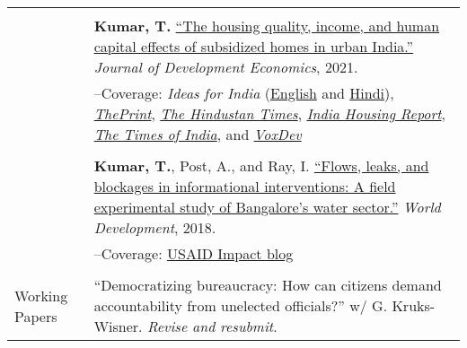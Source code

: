 \documentclass[letterpaper, 10.5pt]{article}
\begin{document}
\begin{longtable}{p{1.5in}p{5in}}
& \\

&\textbf{Kumar, T.} \href{https://doi.org/10.1016/j.jdeveco.2021.102738}{``The housing quality, income, and human capital effects of subsidized homes in urban India.''} \textit{Journal of Development Economics}, 2021.\\

&--\indent Coverage: \textit{Ideas for India} (\href{https://www.ideasforindia.in/topics/poverty-inequality/household-level-effects-of-affordable-housing-evidence-from-mumbai.html}{English} and \href{https://www.ideasforindia.in/topics/poverty-inequality/household-level-effects-of-affordable-housing-evidence-from-mumbai-hindi.html}{Hindi}), \href{https://theprint.in/opinion/mumbai-residents-win-govt-housing-lottery-and-spend-more-on-kids-education-jobs-study/290485/}{\textit{ThePrint}}, \href{https://www.hindustantimes.com/opinion/housing-is-a-welfare-weapon-it-can-help-people-escape-poverty-101629993983576.html}{\textit{The Hindustan Times}}, \href{https://indiahousingreport.in/outputs/opinion/housing-is-a-welfare-weapon-it-can-help-people-escape-poverty/}{\textit{India Housing Report}}, \href{https://timesofindia.indiatimes.com/city/mumbai/mhada-home-winners-see-upswing-in-family-edu-pay-in-mumbai-study/articleshow/86468320.cms}{\textit{The Times of India}}, and \href{https://voxdev.org/topic/infrastructure-urbanisation/household-level-effects-subsidised-housing-evidence-urban-india?utm_source=dlvr.it&utm_medium=twitter}{\textit{VoxDev}} \\
& \\

&\textbf{Kumar, T.},  Post, A., and Ray, I. \href{https://www.sciencedirect.com/science/article/pii/S0305750X1830032}{``Flows, leaks, and blockages in informational interventions: A field experimental study of Bangalore's water sector.''} \textit{World Development}, 2018.\\

&--\indent Coverage: \href{https://blog.usaid.gov/2016/05/using-mobile-phones-to-alert-households-waiting-for-nextdrop-of-water/}{USAID Impact blog} \\
& \\


Working Papers

&``Democratizing bureaucracy: How can citizens demand accountability from unelected officials?'' w/ G. Kruks-Wisner. \textit{Revise and resubmit}.\\




\end{longtable}
\end{document}
